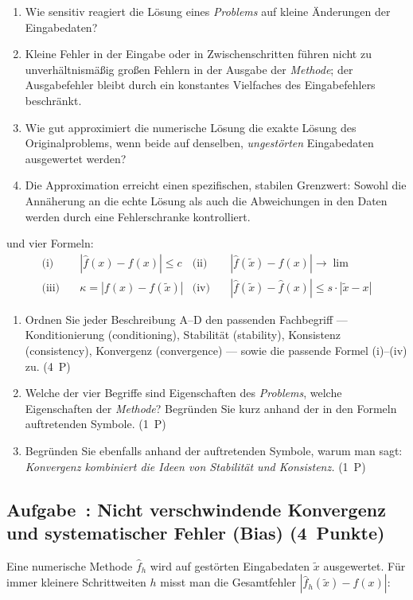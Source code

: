 \documentclass[a4paper,11pt]{scrartcl}
\newcounter{aufgabe}
\newcommand{\Aufgabe}[2]{%
  \refstepcounter{aufgabe}%
  \subsection*{Aufgabe~\theaufgabe: #1 \hfill (#2~Punkte)}%
  \label{auf:\theaufgabe}}
\begin{document}
\begin{enumerate}[label=\textbf{\Alph*.}]
  \item Wie sensitiv reagiert die Lösung eines \emph{Problems} auf kleine Änderungen der Eingabedaten?
  \item Kleine Fehler in der Eingabe oder in Zwischenschritten führen nicht zu unverhältnismäßig großen Fehlern in der Ausgabe der \emph{Methode}; der Ausgabefehler bleibt durch ein konstantes Vielfaches des Eingabefehlers beschränkt.
  \item Wie gut approximiert die numerische Lösung die exakte Lösung des Originalproblems, wenn beide auf denselben, \emph{ungestörten} Eingabedaten ausgewertet werden?
  \item Die Approximation erreicht einen spezifischen, stabilen Grenzwert: Sowohl die Annäherung an die echte Lösung als auch die Abweichungen in den Daten werden durch eine Fehlerschranke kontrolliert.
\end{enumerate}

und vier Formeln:
\begin{align*}
\text{(i)}\quad & \left|\hat{f}(x) - f(x)\right| \leq c
& \text{(ii)}\quad & \left|\hat{f}(\tilde{x}) - f(x)\right| \to \lim \\
\text{(iii)}\quad & \kappa = \left|f(x) - f(\tilde{x})\right|
& \text{(iv)}\quad & \left|\hat{f}(\tilde{x}) - \hat{f}(x)\right| \leq s \cdot |\tilde{x} - x|
\end{align*}

\begin{enumerate}[label=(\alph*)]
  \item Ordnen Sie jeder Beschreibung A--D den passenden Fachbegriff --- Konditionierung (conditioning), Stabilität (stability), Konsistenz (consistency), Konvergenz (convergence) --- sowie die passende Formel (i)--(iv) zu. \hfill (4~P)
  \item Welche der vier Begriffe sind Eigenschaften des \emph{Problems}, welche Eigenschaften der \emph{Methode}? Begründen Sie kurz anhand der in den Formeln auftretenden Symbole. \hfill (1~P)
  \item Begründen Sie ebenfalls anhand der auftretenden Symbole, warum man sagt: \emph{Konvergenz kombiniert die Ideen von Stabilität und Konsistenz.} \hfill (1~P)
\end{enumerate}

\schreibraum[9]
\Aufgabe{Nicht verschwindende Konvergenz und systematischer Fehler (Bias)}{4}

Eine numerische Methode $\hat{f}_h$ wird auf gestörten Eingabedaten $\tilde{x}$ ausgewertet. Für immer kleinere Schrittweiten $h$ misst man die Gesamtfehler $\left|\hat{f}_h(\tilde{x}) - f(x)\right|$:
\end{document}
